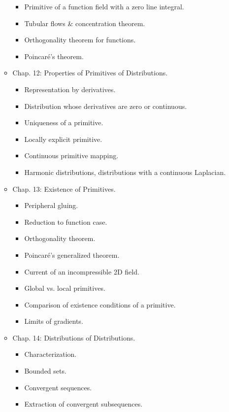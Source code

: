 \documentclass{article}
\begin{document}
\begin{enumerate}
\begin{itemize}
		\begin{itemize}
			\item {\sf Primitive of a function field with a zero line integral.}
			\item {\sf Tubular flows \& concentration theorem.}
			\item {\sf Orthogonality theorem for functions.}
			\item {\sf Poincar\'e's theorem.}
		\end{itemize}
		\item {\sf Chap. 12: Properties of Primitives of Distributions.}
		\begin{itemize}
			\item {\sf Representation by derivatives.}
			\item {\sf Distribution whose derivatives are zero or continuous.}
			\item {\sf Uniqueness of a primitive.}
			\item {\sf Locally explicit primitive.}
			\item {\sf Continuous primitive mapping.}
			\item {\sf Harmonic distributions, distributions with a continuous Laplacian.}
		\end{itemize}
		\item {\sf Chap. 13: Existence of Primitives.}
		\begin{itemize}
			\item {\sf Peripheral gluing.}
			\item {\sf Reduction to function case.}
			\item {\sf Orthogonality theorem.}
			\item {\sf Poincar\'e's generalized theorem.}
			\item {\sf Current of an incompressible 2D field.}
			\item {\sf Global vs. local primitives.}
			\item {\sf Comparison of existence conditions of a primitive.}
			\item {\sf Limits of gradients.}
		\end{itemize}
		\item {\sf Chap. 14: Distributions of Distributions.}
		\begin{itemize}
			\item {\sf Characterization.}
			\item {\sf Bounded sets.}
			\item {\sf Convergent sequences.}
			\item {\sf Extraction of convergent subsequences.}

\end{itemize}
\end{itemize}
\end{enumerate}
\end{document}
